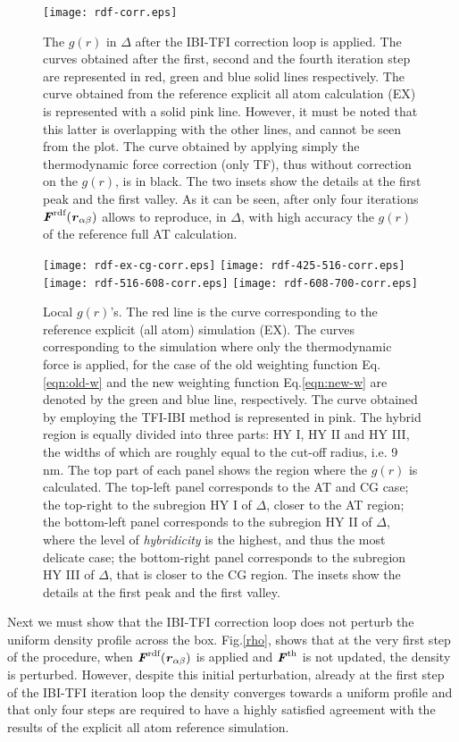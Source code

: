 \documentclass[aps,pre,preprint]{revtex4}
\renewcommand{\v}[1]{\textbf{\textit{#1}}}
\begin{document}
\begin{figure}
  \centering
  \texttt{[image: rdf-corr.eps]}
  \caption{The $g(r)$ in $\Delta$ after the IBI-TFI correction loop is applied.  The
    curves obtained after the first, second and the fourth iteration step are represented in red, green and blue solid lines respectively.  The
    curve obtained from the reference explicit all atom calculation (EX) is represented with a solid pink line. However, it must be noted that this latter 
is overlapping with the other lines, and cannot be seen from the
    plot. The curve obtained by applying simply the thermodynamic force correction (only TF),  thus without
    correction on the $g(r)$, is in black. The two insets
    show the details at the
    first peak and the first valley. As it can be seen, after only four iterations $\v F^{\textrm{rdf}}(\v r_{\alpha\beta})$ allows to reproduce, in $\Delta$, with high accuracy the $g(r)$ of the reference full AT calculation.}
  \label{fig:tmp4}
\end{figure} 
\begin{figure}
  \centering
  \texttt{[image: rdf-ex-cg-corr.eps]}
  \texttt{[image: rdf-425-516-corr.eps]}
  \texttt{[image: rdf-516-608-corr.eps]}
  \texttt{[image: rdf-608-700-corr.eps]}
  \caption{Local $g(r)$'s. The red line is the curve corresponding to the reference explicit (all atom)
    simulation (EX). The curves corresponding to the simulation where only the thermodynamic force is applied, for the case of  
    the old weighting function Eq.\eqref{eqn:old-w} and
    the new weighting function Eq.\eqref{eqn:new-w} are denoted by the
    green and blue line, respectively. The curve obtained by employing the TFI-IBI
    method is represented in pink.
The hybrid region is equally
    divided into three parts: HY I, HY II and HY III, the widths of
    which are roughly equal to the cut-off radius, i.e. 9 \textsf{nm}. 
The top part of each panel shows the region where the $g(r)$ is calculated.
The top-left panel corresponds to the AT and CG case; the top-right to the subregion HY I of $\Delta$, 
closer to the AT region; the bottom-left panel corresponds to the  subregion HY II of $\Delta$, where the level of {\it hybridicity} is the highest, and thus the most delicate case; the bottom-right panel corresponds to the  subregion HY III of $\Delta$, that is closer to the CG region. The insets show the details at the first peak and the first valley.}
  \label{fig:tmp7}
\end{figure}
Next we must show that the IBI-TFI correction loop does not perturb the uniform density profile across the box. Fig.\ref{rho}, shows that at the very first step of the procedure, when $\v F^{\textrm{rdf}}(\v r_{\alpha\beta})$ is applied and ${\v F}^{\textrm{th}}$ is not updated, the density is perturbed. However, despite this initial perturbation, already at the first step of the IBI-TFI iteration loop the density converges towards a uniform profile and that only four steps are required to have a highly satisfied agreement with the results of the explicit all atom reference simulation.
\end{document}
